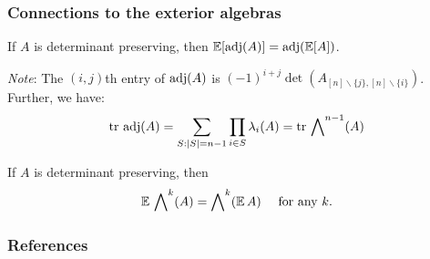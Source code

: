 \documentclass[10pt]{beamer}
\begin{document}
\begin{frame}
  \frametitle{Connections to the exterior algebras}
    \begin{lemma}[Adjugate]
    If $A$ is determinant preserving, then  $\mathbb E[\operatorname{\textnormal{adj}}(A)]=\operatorname{\textnormal{adj}}(\mathbb E[A])$.
  \end{lemma}
\emph{Note}: The $(i,j)$th entry of $\operatorname{\textnormal{adj}}(A)$ is
$(-1)^{i+j}\det(A_{[n]\backslash\{j\},[n]\backslash\{i\}})$.\\[2mm]
Further, we have:
\begin{align*}
  \mathrm{tr}\,\operatorname{\textnormal{adj}}(A) = \sum_{S:|S|=n-1}\prod_{i\in S}\lambda_i(A) = \mathrm{tr}\,\bigwedge\nolimits^{n-1}(A)
\end{align*}

\begin{conjecture}
  If $A$ is determinant preserving, then
  \begin{align*}
\mathbb E\,\bigwedge\nolimits^{k}(A) = \bigwedge\nolimits^k(\mathbb E\,A)\quad\text{
    for any $k$.}
    \end{align*}
  \end{conjecture}
\end{frame}

\begin{frame}[allowframebreaks]
  \frametitle{References}
  \small
  
  
\end{frame}
\end{document}
